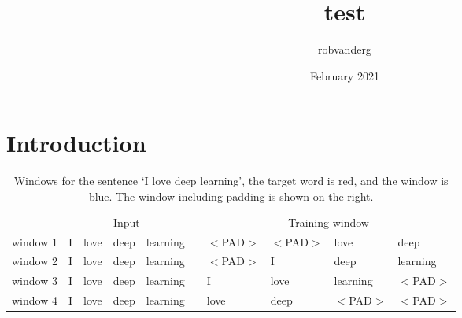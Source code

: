 \documentclass{article}
\title{test}
\author{robvanderg }
\date{February 2021}
\begin{document}
\maketitle

\section{Introduction}
\begin{table}
\centering
\begin{tabular}{p{2cm} l l l l p{.2cm} l l l l }
& \multicolumn{4}{c}{Input} & & \multicolumn{4}{c}{Training window} \\
window 1 & \color{red} I & \color{blue} love & \color{blue} deep & learning & & $<$PAD$>$ & $<$PAD$>$ & love & deep \\
window 2 & \color{blue} I & \color{red} love & \color{blue} deep & \color{blue} learning & & $<$PAD$>$ & I & deep & learning \\
window 3 & \color{blue} I & \color{blue} love & \color{red} deep & \color{blue} learning & & I & love & learning & $<$PAD$>$\\
window 4 & I & \color{blue} love & \color{blue} deep & \color{red} learning & & love & deep & $<$PAD$>$ & $<$PAD$>$\\
\end{tabular}
\caption{Windows for the sentence `I love deep learning', the target word is \color{red}red\color{black}, and the window is \color{blue}blue\color{black}. The window including padding is shown on the right.}
\end{table}
\end{document}
